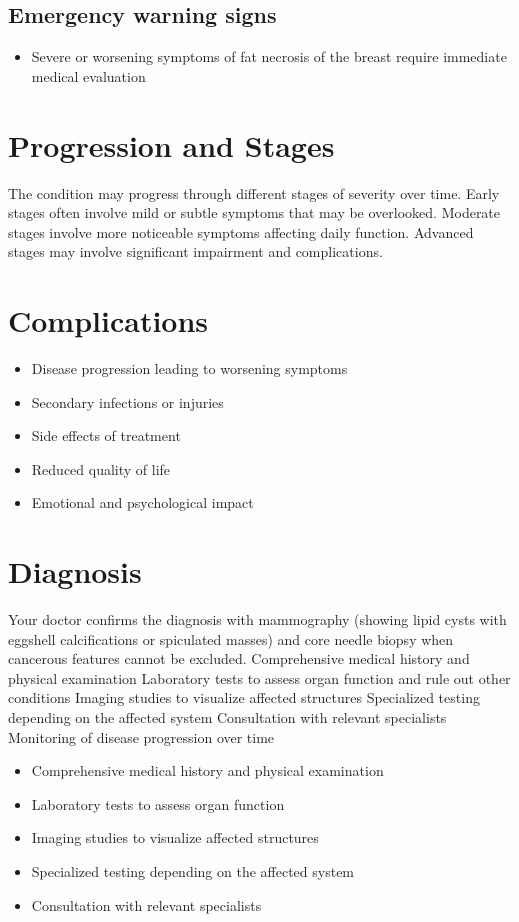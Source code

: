 \subsection{Emergency warning signs}
\begin{itemize}[noitemsep]
  \item Severe or worsening symptoms of fat necrosis of the breast require immediate medical evaluation
\end{itemize}
\section{Progression and Stages}
The condition may progress through different stages of severity over time. Early stages often involve mild or subtle symptoms that may be overlooked. Moderate stages involve more noticeable symptoms affecting daily function. Advanced stages may involve significant impairment and complications.
\section{Complications}
\begin{itemize}[noitemsep]
  \item Disease progression leading to worsening symptoms
  \item Secondary infections or injuries
  \item Side effects of treatment
  \item Reduced quality of life
  \item Emotional and psychological impact
\end{itemize}
\section{Diagnosis}
Your doctor confirms the diagnosis with mammography (showing lipid cysts with eggshell calcifications or spiculated masses) and core needle biopsy when cancerous features cannot be excluded. Comprehensive medical history and physical examination Laboratory tests to assess organ function and rule out other conditions Imaging studies to visualize affected structures Specialized testing depending on the affected system Consultation with relevant specialists Monitoring of disease progression over time

\begin{itemize}[noitemsep]
  \item Comprehensive medical history and physical examination
  \item Laboratory tests to assess organ function
  \item Imaging studies to visualize affected structures
  \item Specialized testing depending on the affected system
  \item Consultation with relevant specialists
\end{itemize}
